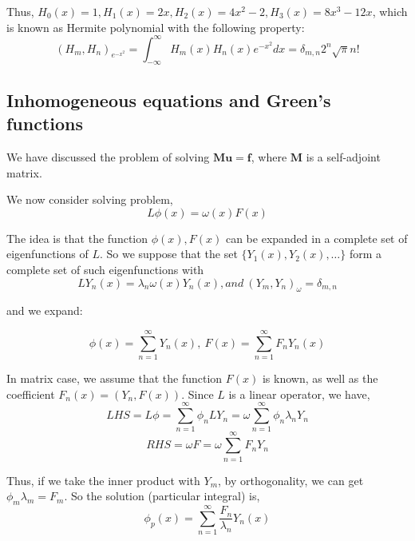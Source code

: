 \documentclass{article}
\theoremstyle{definition}
\begin{document}
Thus, $H_0(x)=1, H_1(x)=2x, H_2(x)=4x^2-2, H_3(x)=8x^3-12x$, which is known as Hermite polynomial with the following property:
\begin{equation}
(H_m,H_n)_{e^{-x^2}}=\int_{-\infty}^{\infty}H_m(x)H_n(x)e^{-x^2}dx=\delta_{m,n}2^n\sqrt{\pi}n!
\end{equation}

\subsection{Inhomogeneous equations and Green's functions}

We have discussed the problem of solving $\mathbf{Mu}=\mathbf{f}$, where $\mathbf{M}$ is a self-adjoint matrix.

We now consider solving problem,
\begin{equation}
L \phi(x)=\omega (x)F(x)
\end{equation}

The idea is that the function $\phi(x), F(x)$ can be expanded in a complete set of eigenfunctions of $L$. So we suppose that the set $\{Y_1(x),Y_2(x),\ldots\}$ form a complete set of such eigenfunctions with 
\begin{equation}
LY_n(x)=\lambda_n\omega(x)Y_n(x), and \ (Y_m,Y_n)_\omega =\delta_{m,n}
\end{equation}

and we expand:

\begin{equation}
\phi(x)=\sum_{n=1}^{\infty} Y_n(x), \ F(x)=\sum_{n=1}^{\infty} F_n Y_n(x)
\end{equation}

In matrix case, we assume that the function $F(x)$ is known, as well as the coefficient $F_n(x)=(Y_n,F(x))$. Since $L$ is a linear operator, we have,
\begin{equation}
LHS=L\phi=\sum_{n=1}^{\infty}\phi_nLY_n=\omega \sum_{n=1}^{\infty}\phi_n\lambda_nY_n
\end{equation}
\begin{equation}
RHS=\omega F=\omega \sum_{n=1}^{\infty} F_n Y_n
\end{equation}

Thus, if we take the inner product with $Y_m$, by orthogonality, we can get $\phi_m\lambda_m=F_m$.
So the solution (particular integral) is,
\begin{equation}
\phi_p(x)=\sum_{n=1}^{\infty} \frac{F_n}{\lambda_n}Y_n(x)
\end{equation}
\end{document}
